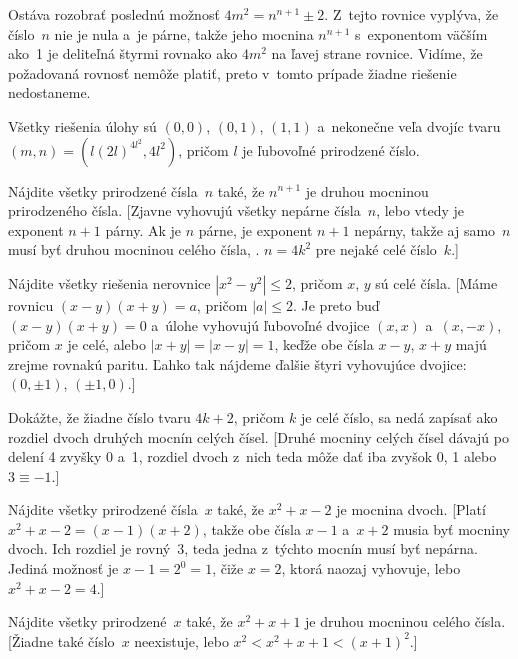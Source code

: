 {Ostáva rozobrať poslednú možnosť $4m^2 = n^{n+1} \pm 2$.
Z~tejto rovnice vyplýva, že číslo~$n$ nie je nula a~je párne, takže jeho
mocnina $n^{n+1}$ s~exponentom väčším ako~1 je deliteľná štyrmi
rovnako ako $4m^2$ na ľavej strane rovnice. Vidíme, že požadovaná rovnosť nemôže
platiť, preto v~tomto prípade žiadne riešenie nedostaneme.

\zaver
Všetky riešenia úlohy sú $(0, 0)$, $(0, 1)$, $(1, 1)$ a~nekonečne veľa
dvojíc tvaru $(m, n) = (l (2l)^{4l^2}, 4l^2)$, pričom $l$ je
ľubovoľné prirodzené číslo.


Nájdite všetky prirodzené čísla~$n$ také, že
$n^{n+1}$ je druhou mocninou prirodzeného čísla.
[Zjavne vyhovujú
všetky nepárne čísla~$n$, lebo vtedy je exponent $n+1$ párny.
Ak je $n$ párne, je exponent $n+1$ nepárny, takže aj samo~$n$
musí byť druhou mocninou celého čísla, \tj. $n = 4k^2$
pre nejaké celé číslo~$k$.]

Nájdite všetky riešenia nerovnice $|x^2-y^2| \le 2$, pričom $x$, $y$
sú celé čísla. [Máme rovnicu $(x-y)(x+y)=a$, pričom $|a|\le2$.
Je preto buď $(x-y)(x+y)=0$ a~úlohe vyhovujú
ľubovoľné dvojice $(x,x)$ a~$(x,{-x})$, pričom $x$ je celé, alebo
$|x+y|=|x-y|=1$, keďže obe čísla $x-y$, $x+y$ majú zrejme rovnakú paritu.
Ľahko tak nájdeme ďalšie štyri vyhovujúce dvojice:
$(0, {\pm 1})$, $({\pm 1}, 0)$.]

\D
Dokážte, že žiadne číslo tvaru $4k+2$, pričom $k$ je
celé číslo, sa nedá zapísať ako rozdiel dvoch druhých mocnín
celých čísel. [Druhé mocniny celých čísel dávajú po delení 4
zvyšky 0 a~1, rozdiel dvoch z~nich teda môže dať iba zvyšok 0, 1
alebo $3\equiv{-1}$.]

Nájdite všetky prirodzené čísla~$x$ také, že $x^2+x-2$ je mocnina dvoch.
[Platí $x^2+x-2 = (x-1)(x+2)$, takže obe
čísla $x-1$ a~$x+2$ musia byť mocniny dvoch. Ich rozdiel je rovný~3, teda
jedna z~týchto mocnín musí byť nepárna. Jediná možnosť je $x-1 = 2^0=1$, čiže
$x = 2$, ktorá naozaj vyhovuje, lebo $x^2+x-2 = 4$.]

Nájdite všetky prirodzené~$x$ také, že $x^2+x+1$ je
druhou mocninou celého čísla.
[Žiadne také číslo~$x$ neexistuje, lebo $x^2 <x^2+x+1 <(x+1)^2$.]
}

